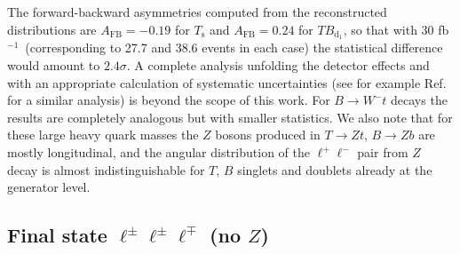 \documentclass[12pt,a4paper]{article}
\newcommand{\fbin}{fb$^{-1}$}
\newcommand{\Ts}{T_\text{s}}
\newcommand{\TBd}{TB_{\text{d}_1}}
\begin{document}
The forward-backward asymmetries computed from the reconstructed distributions are $A_\text{FB} = -0.19$ for $\Ts$ and $A_\text{FB} = 0.24$ for $\TBd$, so that with 30 \fbin\ (corresponding to 27.7 and 38.6 events in each case) the statistical difference would amount to $2.4\sigma$. A complete analysis unfolding the detector effects and with an appropriate calculation of systematic uncertainties (see for example Ref.~\cite{AguilarSaavedra:2007rs} for a similar analysis)
is beyond the scope of this work. For $B \to W^- t$ decays the results are completely analogous but with smaller statistics. We also note that for these large heavy quark masses the $Z$ bosons produced in 
$T \to Zt$, $B \to Zb$ are mostly longitudinal, and the angular distribution of the $\ell^+ \ell^-$ pair from $Z$ decay is almost indistinguishable for $T$, $B$ singlets and doublets already at the generator level.











\subsection{Final state $\ell^\pm \ell^\pm \ell^\mp$ (no $Z$)}
\end{document}
